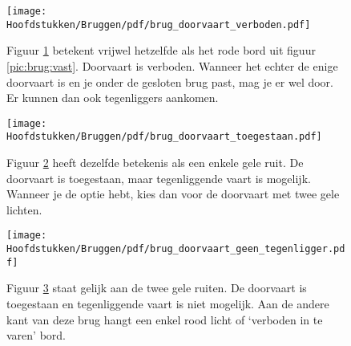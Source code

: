 \newpage

\begin{figure}[H]
  \centering
  \begin{minipage}[b]{0.18\textwidth}
    \texttt{[image: Hoofdstukken/Bruggen/pdf/brug\_doorvaart\_verboden.pdf]}
    \caption{}
    \label{pic:brug:verboden}
  \end{minipage}
  \hfill
  \begin{minipage}[t]{0.75\textwidth}
  	\vspace{-2.5cm}
    Figuur \ref{pic:brug:verboden} betekent vrijwel hetzelfde als het rode bord uit figuur \ref{pic:brug:vast}. Doorvaart is verboden. Wanneer het echter de enige doorvaart is en je onder de gesloten brug past, mag je er wel door. Er kunnen dan ook tegenliggers aankomen.
  \end{minipage}
\end{figure}
\vspace{-0.75cm}
\begin{figure}[H]
	\centering
	\begin{minipage}[b]{0.18\textwidth}
		\texttt{[image: Hoofdstukken/Bruggen/pdf/brug\_doorvaart\_toegestaan.pdf]}
		\caption{}
		\label{pic:brug:toegestaan}
	\end{minipage}
	\hfill
	\begin{minipage}[t]{0.75\textwidth}
	\vspace{-2.5cm}
	Figuur \ref{pic:brug:toegestaan} heeft dezelfde betekenis als een enkele gele ruit. De doorvaart is toegestaan, maar tegenliggende vaart is mogelijk. Wanneer je de optie hebt, kies dan voor de doorvaart met twee gele lichten. 
\end{minipage}
\end{figure}
\vspace{-0.75cm}
\begin{figure}[H]
\centering
\begin{minipage}[b]{0.18\textwidth}
	\texttt{[image: Hoofdstukken/Bruggen/pdf/brug\_doorvaart\_geen\_tegenligger.pdf]}
	\caption{}
	\label{pic:brug:toegestaan_tegenligger}
\end{minipage}
\hfill
\begin{minipage}[t]{0.75\textwidth}
	\vspace{-2.5cm}
	Figuur \ref{pic:brug:toegestaan_tegenligger} staat gelijk aan de twee gele ruiten. De doorvaart is toegestaan en tegenliggende vaart is niet mogelijk. Aan de andere kant van deze brug hangt een enkel rood licht of `verboden in te varen' bord.
\end{minipage}
\end{figure}
